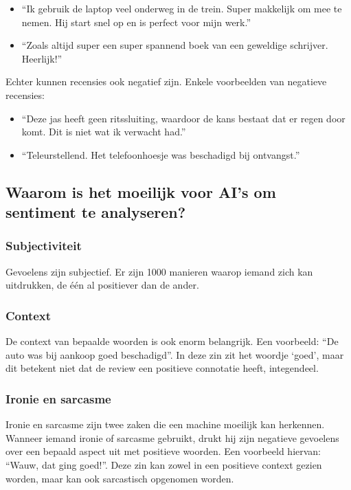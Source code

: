 \begin{itemize}
    \item “Ik gebruik de laptop veel onderweg in de trein. Super makkelijk om mee te nemen. Hij start snel op en is perfect voor mijn werk.”
    \item “Zoals altijd super een super spannend boek van een geweldige schrijver. Heerlijk!”
\end{itemize}

Echter kunnen recensies ook negatief zijn. Enkele voorbeelden van negatieve recensies:

\begin{itemize}
    \item “Deze jas heeft geen ritssluiting, waardoor de kans bestaat dat er regen door komt. Dit is niet wat ik verwacht had.”
    \item “Teleurstellend. Het telefoonhoesje was beschadigd bij ontvangst.”
\end{itemize}

\subsection{Waarom is het moeilijk voor AI's om sentiment te analyseren?}
\label{moeilijksentimentanalyseren}

\subsubsection{Subjectiviteit}
\label{subjectiviteit}

Gevoelens zijn subjectief. Er zijn 1000 manieren waarop iemand zich kan uitdrukken, de één al positiever dan de ander. 

\subsubsection{Context}
\label{context}

De context van bepaalde woorden is ook enorm belangrijk. Een voorbeeld: “De auto was bij aankoop goed beschadigd”. In deze zin zit het woordje ‘goed’, maar dit betekent niet dat de review een positieve connotatie heeft, integendeel. \autocite{MonkeyLearn2021}

\subsubsection{Ironie en sarcasme}
\label{ironiesarcasme}

Ironie en sarcasme zijn twee zaken die een machine moeilijk kan herkennen. Wanneer iemand ironie of sarcasme gebruikt, drukt hij zijn negatieve gevoelens over een bepaald aspect uit met positieve woorden. \autocite{MonkeyLearn2021} Een voorbeeld hiervan: “Wauw, dat ging goed!”. Deze zin kan zowel in een positieve context gezien worden, maar kan ook sarcastisch opgenomen worden. 

